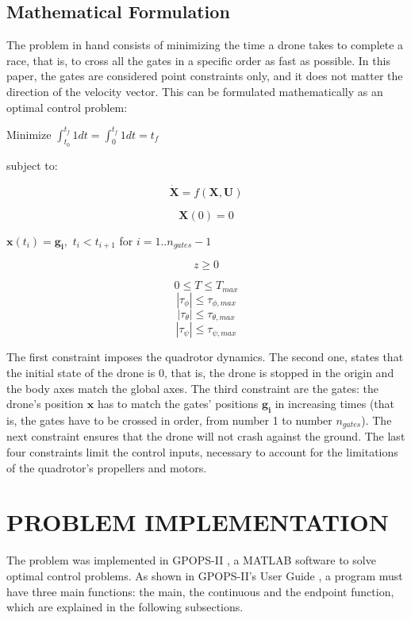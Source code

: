 \documentclass[letterpaper, 10 pt, conference]{ieeeconf}  %
\begin{document}
\subsection{Mathematical Formulation}\label{subs:math_form}
The problem in hand consists of minimizing the time a drone takes to complete a race, that is, to cross all the gates in a specific order as fast as possible. In this paper, the gates are considered point constraints only, and it does not matter the direction of the velocity vector. This can be formulated mathematically as an optimal control problem:

\bigskip

Minimize \quad $\int_{t_0}^{t_f} 1 dt = \int_{0}^{t_f} 1 dt = t_f$

\bigskip

subject to:

$$ \bm{\dot{X}} = f(\boldsymbol{X}, \boldsymbol{U}) $$

$$ \bm{X}(0) = 0 $$

\quad $ \bm{x}(t_i) = \bm{g_i},$ \quad $t_i < t_{i+1} $ for $i = 1 .. n_{gates}-1$

$$ z \ge 0 $$

$$ 0 \le T \le T_{max} $$
$$  |\tau_{\phi}| \le \tau_{\phi,max} $$
$$  |\tau_{\theta}| \le \tau_{\theta,max} $$
$$  |\tau_{\psi}| \le \tau_{\psi,max} $$

The first constraint imposes the quadrotor dynamics. The second one, states that the initial state of the drone is 0, that is, the drone is stopped in the origin and the body axes match the global axes. The third constraint are the gates: the drone's position $\bm{x}$ has to match the gates' positions $\bm{g_i}$ in increasing times (that is, the gates have to be crossed in order, from number 1 to number $n_{gates}$). The next constraint ensures that the drone will not crash against the ground. The last four constraints limit the control inputs, necessary to account for the limitations of the quadrotor's propellers and motors.

\section{PROBLEM IMPLEMENTATION}\label{s:impl}

The problem was implemented in GPOPS-II \cite{patterson2014gpops}, a MATLAB software to solve optimal control problems. As shown in GPOPS-II's User Guide \cite{gpops_guide}, a program must have three main functions: the main, the continuous and the endpoint function, which are explained in the following subsections.
\end{document}
